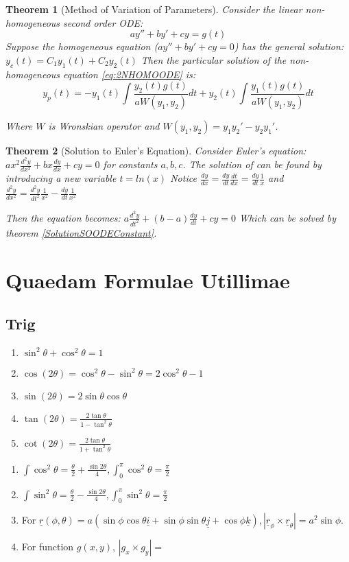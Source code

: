 \documentclass[9pt]{article}
\newtheorem{theorem}{Theorem}[subsection]
\theoremstyle{definition}
\theoremstyle{remark}
\begin{document}
\begin{theorem}[Method of Variation of Parameters]
	Consider the linear non-homogeneous second order ODE:
\begin{equation}\label{eq:2NHOMOODE}
	ay'' + by' + cy = g(t)
\end{equation}
Suppose the homogeneous equation ($ay'' + by' + cy = 0$) has the general solution:
$
	y_c(t) = C_1y_1(t) + C_2y_2(t)
$
Then the particular solution of the non-homogeneous equation \ref{eq:2NHOMOODE} is: 
\[
	y_p(t) = -y_1(t)\int \frac{y_2(t)g(t)}{aW(y_1,y_2)} dt + y_2(t)\int \frac{y_1(t)g(t)}{aW(y_1,y_2)} dt
\]

Where $W$ is Wronskian operator and 
$W(y_1,y_2) = y_1y_2' - y_2y_1'$.
\end{theorem}

\begin{theorem}[Solution to Euler's Equation]
	Consider Euler's equation:
$
	ax^2 \frac{d^2y}{dx^2} + bx \frac{dy}{dx} + cy = 0
$
for constants $a,b,c$. The solution of can be found by introducing a new variable $t = ln(x)$
Notice $ \frac{dy}{dx} = \frac{dy}{dt} \frac{dt}{dx} = \frac{dy}{dt} \frac{1}{x}$
and $ \frac{d^2y}{dx^2} = \frac{d^2y}{dt^2} \frac{1}{x^2} - \frac{dy}{dt} \frac{1}{x^2}$

Then the equation becomes:
$
	a\frac{d^2y}{dt^2} + (b-a)\frac{dy}{dt} + cy = 0
$
Which can be solved by theorem \ref{SolutionSOODEConstant}.
\end{theorem}
\section{Quaedam Formulae Utillimae}
\subsection{Trig}
\begin{enumerate}
	\item $\sin^2{\theta} + \cos^2{\theta} = 1$
	\item $\cos(2\theta) = \cos^2{\theta} - \sin^2{\theta} = 2\cos^2{\theta} - 1$
	\item $\sin(2\theta) = 2\sin{\theta}\cos{\theta}$
	\item $\tan(2\theta) = \frac{2\tan{\theta}}{1-\tan^2{\theta}}$
	\item $\cot(2\theta) = \frac{2\tan{\theta}}{1+\tan^2{\theta}}$
\end{enumerate}

\begin{enumerate}
	\item $\int \cos^2{\theta} = \frac{\theta}{2} + \frac{\sin{2\theta}}{4}, \int_0^{\pi} \cos^2{\theta} = \frac{\pi}{2} $
	\item $\int \sin^2{\theta} = \frac{\theta}{2} - \frac{\sin{2\theta}}{4},  \int_0^{\pi} \sin^2{\theta} = \frac{\pi}{2} $
	\item For $ \underline{r}(\phi, \theta) = 
		a(\sin{\phi}\cos{\theta} \underline{i} +
		\sin{\phi}\sin{\theta} \underline{j} + 
		\cos{\phi} \underline{k}), 
		|\underline{r}_{\phi} \times \underline{r}_{\theta}| = 
		a^2\sin{\phi}$.
	\item For function $g(x,y)$, $|g_x \times g_y| = $ 


\end{enumerate}
\end{document}
